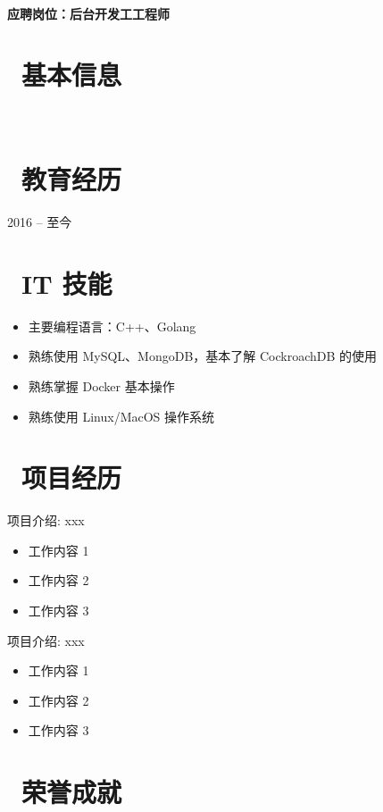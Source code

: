 \documentclass{resume}
\begin{document}


  \hfill \vspace{2mm} \\
\textbf{应聘岗位：后台开发⼯工程师}

\section{\faInfo\ 基本信息} \vspace{1mm}
{\phone {} \qquad\qquad\quad
\email {} \vspace{2mm} \\
\github {} \qquad
\faLink {}}


\section{\faGraduationCap\ 教育经历} \vspace{1mm}
 {2016 -- 至今}

\section{\faCogs\ IT 技能} \vspace{1mm}
\begin{itemize}[parsep=1ex]
  \item 主要编程语言：C++、Golang
  \item 熟练使⽤ MySQL、MongoDB，基本了解 CockroachDB 的使用
  \item 熟练掌握 Docker 基本操作
  \item 熟练使⽤ Linux/MacOS 操作系统
\end{itemize} \vspace{1mm}

\section{\faUsers\ 项目经历}
项目介绍: xxx
\begin{itemize}[parsep=1ex]
  \item 工作内容 1
  \item 工作内容 2
  \item 工作内容 3
\end{itemize} \vspace{1mm}

项目介绍: xxx
\begin{itemize}[parsep=1ex]
  \item 工作内容 1
  \item 工作内容 2
  \item 工作内容 3
\end{itemize}

\section{\faTrophy\ 荣誉成就}
\end{document}
